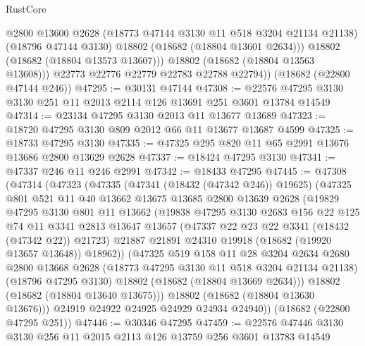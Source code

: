 \begin{lexlean}{RustCore}
\begin{coremodule}
              @2800
              @13600
              @2628
              (@18773 @47144 @3130 @11 @518 @3204 @21134 @21138)
              (@18796 @47144 @3130)
              @18802
              (@18682 (@18804 @13601 @2634)))
            @18802
            (@18682 (@18804 @13573 @13607)))
          @18802
          (@18682 (@18804 @13563 @13608)))
        @22773
        @22776
        @22779
        @22783
        @22788
        @22794))
    (@18682 (@22800 @47144 @246))
@47295 := @30131 @47144
@47308 := @22576 @47295 @3130 @3130 @251 @11 @2013 @2114 @126 @13691 @251 @3601 @13784 @14549
@47314 := @23134 @47295 @3130 @2013 @11 @13677 @13689
@47323 := @18720 @47295 @3130 @809 @2012 @66 @11 @13677 @13687 @4599
@47325 := @18733 @47295 @3130
@47335 := @47325 @295 @820 @11 @65 @2991 @13676 @13686 @2800 @13629 @2628
@47337 := @18424 @47295 @3130
@47341 := @47337 @246 @11 @246 @2991
@47342 := @18433 @47295
@47445 := @47308
    (@47314
      (@47323
        (@47335
          (@47341 (@18432 (@47342 @246)) @19625)
          (@47325
            @801
            @521
            @11
            @40
            @13662
            @13675
            @13685
            @2800
            @13639
            @2628
            (@19829
              @47295
              @3130
              @801
              @11
              @13662
              (@19838
                @47295
                @3130
                @2683
                @156
                @22
                @125
                @74
                @11
                @3341
                @2813
                @13647
                @13657
                (@47337 @22 @23 @22 @3341 (@18432 (@47342 @22)) @21723)
                @21887
                @21891
                @24310
                @19918
                (@18682 (@19920 @13657 @13648))
                @18962))
            (@47325
              @519
              @158
              @11
              @28
              @3204
              @2634
              @2680
              @2800
              @13668
              @2628
              (@18773 @47295 @3130 @11 @518 @3204 @21134 @21138)
              (@18796 @47295 @3130)
              @18802
              (@18682 (@18804 @13669 @2634)))
            @18802
            (@18682 (@18804 @13640 @13675)))
          @18802
          (@18682 (@18804 @13630 @13676)))
        @24919
        @24922
        @24925
        @24929
        @24934
        @24940))
    (@18682 (@22800 @47295 @251))
@47446 := @30346 @47295
@47459 := @22576 @47446 @3130 @3130 @256 @11 @2015 @2113 @126 @13759 @256 @3601 @13783 @14549

\end{coremodule}
\end{lexlean}
